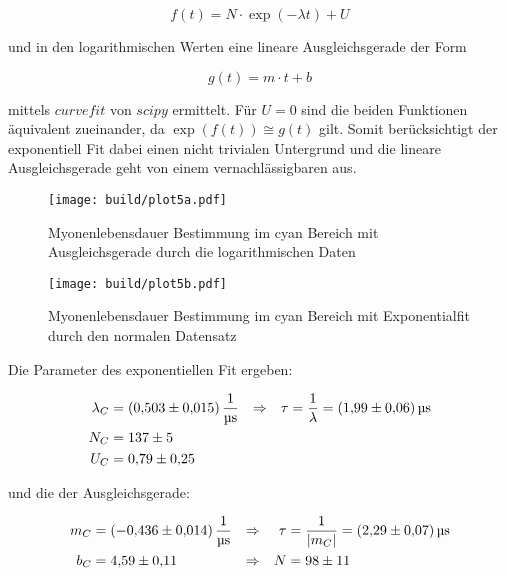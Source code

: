 \begin{equation}
	f(t)=N \cdot \exp(-\lambda t) + U
	\label{eqn:exp}
\end{equation}

und in den logarithmischen Werten eine lineare Ausgleichsgerade der Form

\begin{equation}
	g(t)=m \cdot t +b
	\label{eqn:lin}
\end{equation}

mittels $curve fit$ von $scipy$ ermittelt.
Für $U=0$ sind die beiden Funktionen äquivalent zueinander, da $ \exp(f(t)) \cong g(t)$ gilt. 
Somit berücksichtigt der exponentiell Fit dabei einen nicht trivialen Untergrund und die lineare Ausgleichsgerade geht von einem vernachlässigbaren aus.

\begin{figure}[H]
	\centering
	\texttt{[image: build/plot5a.pdf]}
	\caption{Myonenlebensdauer Bestimmung im cyan Bereich mit Ausgleichsgerade durch die logarithmischen Daten}\label{fig:plt5a}
\end{figure}

\begin{figure}[H]
	\centering
	\texttt{[image: build/plot5b.pdf]}
	\caption{Myonenlebensdauer Bestimmung im cyan Bereich mit Exponentialfit durch den normalen Datensatz}\label{fig:plt5b}
\end{figure}

Die Parameter des exponentiellen Fit ergeben:

\begin{align}
	\lambda_C&=\qty{0.503(0.015)}{\per\us} &\Rightarrow & & \tau&=\frac{1}{\lambda }=\qty{1.99(0.06)}{\us} \\
	N_C&=\num{137(5)} \notag \\
	U_C&=\num{0.79(0.25)} \notag
\end{align}

und die der Ausgleichsgerade: 

\begin{align}
	m_C&=\qty{-0.436(0.014)}{\per\us} &\Rightarrow & & \tau&=\frac{1}{|m_C|}=\qty{2.29(0.07)}{\us} \\
	b_C&=\num{4.59(0.11)} &\Rightarrow & & N&=\num{98(11)} \notag
\end{align}

